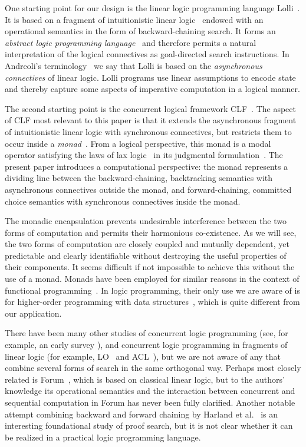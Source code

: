 \documentclass{sig-alt}
\begin{document}
One starting point for our design is the linear logic programming
language Lolli~\cite{Hodas94ic}.  It is based on a fragment of
intuitionistic linear logic~\cite{Girard87tcs} endowed with an
operational semantics in the form of backward-chaining search.  It forms
an \emph{abstract logic programming language}~\cite{Miller91apal} and
therefore permits a natural interpretation of the logical connectives as
goal-directed search instructions.  In Andreoli's
terminology~\cite{Andreoli92} we say that Lolli is based on the
\emph{asynchronous connectives} of linear logic.  Lolli programs use
linear assumptions to encode state and thereby capture some
aspects of imperative computation in a logical manner.

The second starting point is the concurrent logical framework
CLF~\cite{Cervesato02tr,Watkins02tr,Watkins04types}.  The aspect of
CLF most relevant to this paper is that it extends the asynchronous
fragment of intuitionistic linear logic with syn\-chro\-nous
connectives, but restricts them to occur inside a
\emph{monad}~\cite{Moggi91}.  From a logical perspective, this monad
is a modal operator satisfying the laws of lax
logic~\cite{Fairtlough97ic} in its judgmental
formulation~\cite{Pfenning01mscs}.
The present paper introduces a computational perspective:
the monad represents a dividing line between
the backward-chaining, backtracking semantics with asynchronous
connectives outside the monad, and forward-chaining, committed choice
semantics with synchronous connectives inside the monad.

The monadic encapsulation prevents undesirable interference between
the two forms of computation and permits their harmonious
co-existence.  As we will see, the two forms of computation are
closely coupled and mutually dependent, yet predictable and clear\-ly
identifiable without destroying the useful properties of their
components.  It seems difficult if not impossible to achieve this
without the use of a monad.  Monads have been employed for similar
reasons in the context of functional programming~\cite{Wadler92popl}.
In logic programming, their only use we are aware of is for
higher-order programming with data structures~\cite{Bekkers95ilps,McGrail97},
which is quite different from our application.

There have been many other studies of concurrent logic programming (see,
for example, an early survey \cite{Shapiro89}), and concurrent logic
programming in fragments of linear logic (for example, LO~\cite{Andreoli90oopsla} and
ACL~\cite{Kobayashi94tr}), but we are not aware of
any that combine several forms of search in the same orthogonal way.
Perhaps most closely related is Forum~\cite{Miller96tcs}, which is based on
classical linear logic, but to the authors' knowledge its operational
semantics and the interaction between concurrent and sequential
computation in Forum has never been fully clarified.  Another notable
attempt combining backward and forward chaining by Harland et
al.\ \cite{Harland00pstt} is an interesting foundational study of proof
search, but it is not clear whether it can be realized in a practical
logic programming language.
\end{document}

